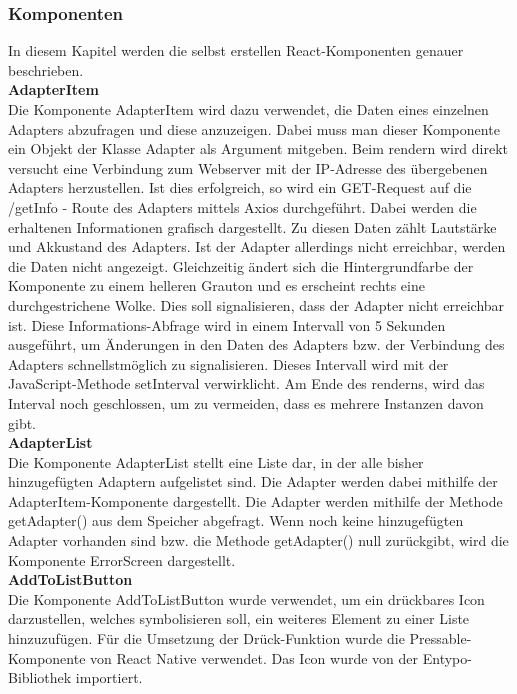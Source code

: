 \documentclass[]{article}
\begin{document}
\subsubsection{Komponenten}
In diesem Kapitel werden die selbst erstellen React-Komponenten genauer beschrieben. \newline \\
\textbf{AdapterItem} \\
Die Komponente AdapterItem wird dazu verwendet, die Daten eines einzelnen Adapters abzufragen und diese anzuzeigen. Dabei muss man dieser Komponente ein Objekt der Klasse Adapter als Argument mitgeben. Beim rendern wird direkt versucht eine Verbindung zum Webserver mit der IP-Adresse des übergebenen Adapters herzustellen. Ist dies erfolgreich, so wird ein GET-Request auf die /getInfo - Route des Adapters mittels Axios durchgeführt. Dabei werden die erhaltenen Informationen grafisch dargestellt. Zu diesen Daten zählt Lautstärke und Akkustand des Adapters. Ist der Adapter allerdings nicht erreichbar, werden die Daten nicht angezeigt. Gleichzeitig ändert sich die Hintergrundfarbe der Komponente zu einem helleren Grauton und es erscheint rechts eine durchgestrichene Wolke. Dies soll signalisieren, dass der Adapter nicht erreichbar ist. Diese Informations-Abfrage wird in einem Intervall von 5 Sekunden ausgeführt, um Änderungen in den Daten des Adapters bzw. der Verbindung des Adapters schnellstmöglich zu signalisieren. Dieses Intervall wird mit der JavaScript-Methode setInterval verwirklicht. Am Ende des renderns, wird das Interval noch geschlossen, um zu vermeiden, dass es mehrere Instanzen davon gibt. \newline \\
\textbf{AdapterList} \\
Die Komponente AdapterList stellt eine Liste dar, in der alle bisher hinzugefügten Adaptern aufgelistet sind. Die Adapter werden dabei mithilfe der AdapterItem-Komponente dargestellt. Die Adapter werden mithilfe der Methode getAdapter() aus dem Speicher abgefragt. Wenn noch keine hinzugefügten Adapter vorhanden sind bzw. die Methode getAdapter() null zurückgibt, wird die Komponente ErrorScreen dargestellt. \newline \\
\textbf{AddToListButton} \\
Die Komponente AddToListButton wurde verwendet, um ein drückbares Icon darzustellen, welches symbolisieren soll, ein weiteres Element zu einer Liste hinzuzufügen. Für die Umsetzung der Drück-Funktion wurde die Pressable-Komponente von React Native verwendet. Das Icon wurde von der Entypo-Bibliothek importiert. \newline \\
\end{document}
